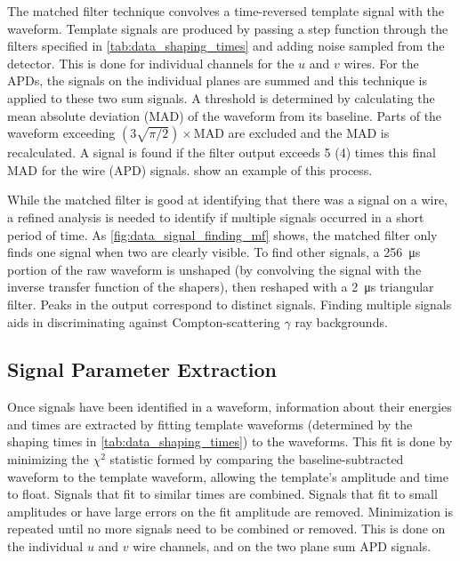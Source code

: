 \documentclass[herrin-thesis.tex]{subfiles}
\begin{document}
The matched filter technique \cite{North:1963fk} convolves a time-reversed template signal with the waveform. Template signals are produced by passing a step function through the filters specified in \cref{tab:data_shaping_times} and adding noise sampled from the detector. This is done for individual channels for the \(u\) and \(v\) wires. For the APDs, the signals on the individual planes are summed and this technique is applied to these two sum signals. A threshold is determined by calculating the mean absolute deviation (MAD) of the waveform from its baseline. Parts of the waveform exceeding \((3\sqrt{\pi/2})\times\text{MAD}\) are excluded and the MAD is recalculated. A signal is found if the filter output exceeds 5 (4) times this final MAD for the wire (APD) signals.  show an example of this process.

While the matched filter is good at identifying that there was a signal on a wire, a refined analysis is needed to identify if multiple signals occurred in a short period of time. As \cref{fig:data_signal_finding_mf} shows, the matched filter only finds one signal when two are clearly visible. To find other signals, a \SI{256}{\micro\s} portion of the raw waveform is unshaped (by convolving the signal with the inverse transfer function of the shapers), then reshaped with a \SI{2}{\micro\s} triangular filter. Peaks in the output correspond to distinct signals. Finding multiple signals aids in discriminating against Compton-scattering \(\gamma\) ray backgrounds.

\subsection{Signal Parameter Extraction}
\label{sec:data_signal_extraction}
Once signals have been identified in a waveform, information about their energies and times are extracted by fitting template waveforms (determined by the shaping times in \cref{tab:data_shaping_times}) to the waveforms. This fit is done by minimizing the \(\chi^2\) statistic formed by comparing the baseline-subtracted waveform to the template waveform, allowing the template's amplitude and time to float. Signals that fit to similar times are combined. Signals that fit to small amplitudes or have large errors on the fit amplitude are removed. Minimization is repeated until no more signals need to be combined or removed. This is done on the individual \(u\) and \(v\) wire channels, and on the two plane sum APD signals.
\end{document}
